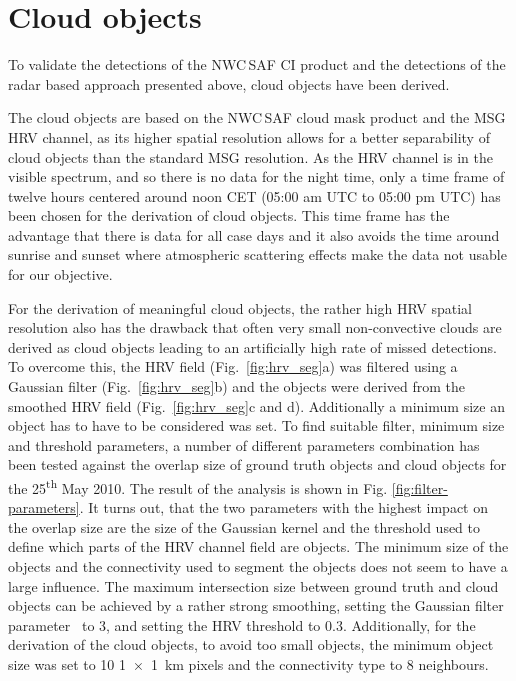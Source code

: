 \section{Cloud objects}
\label{sec:cloud}
To validate the detections of the NWC\,SAF CI product and the detections of the radar based approach presented above, cloud objects have been derived. 

The cloud objects are based on the NWC\,SAF cloud mask product and the MSG HRV channel, as its higher spatial resolution allows for a better separability of cloud objects than the standard MSG resolution. As the HRV channel is in the visible spectrum, and so there is no data for the night time, only a time frame of twelve hours centered around noon CET (05:00 am UTC to 05:00 pm UTC) has been chosen for the derivation of cloud objects. This time frame has the advantage that there is data for all case days and it also avoids the time around sunrise and sunset where atmospheric scattering effects make the data not usable for our objective.

For the derivation of meaningful cloud objects, the rather high HRV spatial resolution also has the drawback that often very small non-convective clouds are derived as cloud objects leading to an artificially high rate of missed detections. To overcome this, the HRV field (Fig.~\ref{fig:hrv_seg}a) was filtered using a Gaussian filter (Fig.~\ref{fig:hrv_seg}b) and the objects were derived from the smoothed HRV field (Fig.~\ref{fig:hrv_seg}c and d). Additionally a minimum size an object has to have to be considered was set. To find suitable filter, minimum size and threshold parameters, a number of different parameters combination has been tested against the overlap size of ground truth objects and cloud objects for the 25\textsuperscript{th} May 2010. The result of the analysis is shown in Fig. \ref{fig:filter-parameters}. It turns out, that the two parameters with the highest impact on the overlap size are the size of the Gaussian kernel and the threshold used to define which parts of the HRV channel field are objects. The minimum size of the objects and the connectivity used to segment the objects does not seem to have a large influence. The maximum intersection size between ground truth and cloud objects can be achieved by a rather strong smoothing, setting the Gaussian filter parameter \textsigma~to 3, and setting the HRV threshold to \num{0.3}. Additionally, for the derivation of the cloud objects, to avoid too small objects, the minimum object size was set to \num{10} \SI{1x1}{\kilo\metre} pixels and the connectivity type to \num{8} neighbours. 
 
